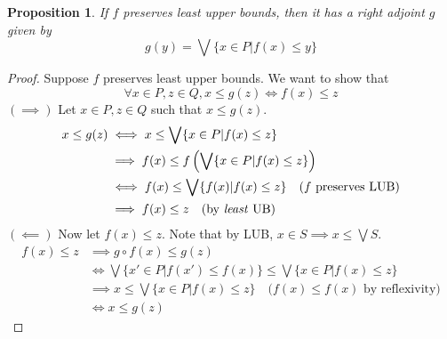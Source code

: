 \documentclass[11pt]{article} %
\newtheorem{proposition}[theorem]{Proposition}
\theoremstyle{definition}
\theoremstyle{definition}
\theoremstyle{definition}
\begin{document}
\begin{proposition}
  If $f$ preserves least upper bounds, then it has a right adjoint $g$ given by
  \[g(y) = \bigvee \{x\in P | f(x) \leq y\}\]
\end{proposition}
\begin{proof}
Suppose $f$ preserves least upper bounds. We want to show that 
\[\forall x\in P, z\in Q, x\leq g(z) \iff f(x) \leq z\]
$(\implies)$ Let $x\in P, z\in Q$ such that $x\leq g(z)$.
\begin{equation}
\begin{aligned}
  x \leq g(z) &\iff x \leq \bigvee \{x\in P | f(x) \leq z\}\\
  &\implies f(x) \leq f\left(\bigvee \{x\in P | f(x) \leq z\}\right)\\
  &\iff f(x) \leq \bigvee \{f(x) | f(x) \leq z\} \quad\text{($f$ preserves LUB)}\\
  &\implies f(x) \leq z \quad\text{(by \textit{least} UB)}
\end{aligned}
\end{equation}
$(\impliedby)$ Now let $f(x) \leq z$. Note that by LUB, $x\in S \implies x \leq \bigvee S$.
\begin{equation}
\begin{aligned}
  f(x) \leq z &\implies g\circ f(x) \leq g(z)\\
  &\iff \bigvee \{x'\in P | f(x') \leq f(x)\} \leq \bigvee \{x \in P | f(x) \leq z\}\\
  &\implies x \leq \bigvee \{x \in P | f(x) \leq z\} \quad\text{($f(x)\leq f(x)$ by reflexivity)} \\
  &\iff x \leq g(z)
\end{aligned}
\end{equation}

\end{proof}
\end{document}
